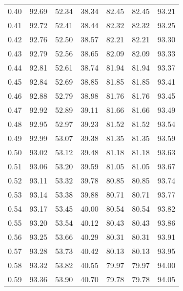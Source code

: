 \begin{tabular}{|c|c|c|c|c|c|c|}
      0.40 &     92.69 &     52.34 &      38.34 &   82.45 &      82.45 &         93.21 \\
      0.41 &     92.72 &     52.41 &      38.44 &   82.32 &      82.32 &         93.25 \\
      0.42 &     92.76 &     52.50 &      38.57 &   82.21 &      82.21 &         93.30 \\
      0.43 &     92.79 &     52.56 &      38.65 &   82.09 &      82.09 &         93.33 \\
      0.44 &     92.81 &     52.61 &      38.74 &   81.94 &      81.94 &         93.37 \\
      0.45 &     92.84 &     52.69 &      38.85 &   81.85 &      81.85 &         93.41 \\
      0.46 &     92.88 &     52.79 &      38.98 &   81.76 &      81.76 &         93.45 \\
      0.47 &     92.92 &     52.89 &      39.11 &   81.66 &      81.66 &         93.49 \\
      0.48 &     92.95 &     52.97 &      39.23 &   81.52 &      81.52 &         93.54 \\
      0.49 &     92.99 &     53.07 &      39.38 &   81.35 &      81.35 &         93.59 \\
      0.50 &     93.02 &     53.12 &      39.48 &   81.18 &      81.18 &         93.63 \\
      0.51 &     93.06 &     53.20 &      39.59 &   81.05 &      81.05 &         93.67 \\
      0.52 &     93.11 &     53.32 &      39.78 &   80.85 &      80.85 &         93.74 \\
      0.53 &     93.14 &     53.38 &      39.88 &   80.71 &      80.71 &         93.77 \\
      0.54 &     93.17 &     53.45 &      40.00 &   80.54 &      80.54 &         93.82 \\
      0.55 &     93.20 &     53.54 &      40.12 &   80.43 &      80.43 &         93.86 \\
      0.56 &     93.25 &     53.66 &      40.29 &   80.31 &      80.31 &         93.91 \\
      0.57 &     93.28 &     53.73 &      40.42 &   80.13 &      80.13 &         93.95 \\
      0.58 &     93.32 &     53.82 &      40.55 &   79.97 &      79.97 &         94.00 \\
      0.59 &     93.36 &     53.90 &      40.70 &   79.78 &      79.78 &         94.05 \\

\end{tabular}
